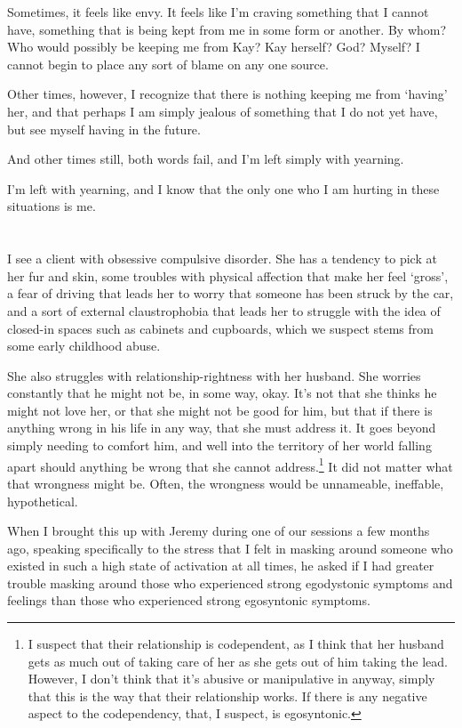 Sometimes, it feels like envy. It feels like I'm craving something that I cannot have, something that is being kept from me in some form or another. By whom? Who would possibly be keeping me from Kay? Kay herself? God? Myself? I cannot begin to place any sort of blame on any one source.

Other times, however, I recognize that there is nothing keeping me from `having' her, and that perhaps I am simply jealous of something that I do not yet have, but see myself having in the future.

And other times still, both words fail, and I'm left simply with yearning.

I'm left with yearning, and I know that the only one who I am hurting in these situations is me.

\section{}

I see a client with obsessive compulsive disorder. She has a tendency to pick at her fur and skin, some troubles with physical affection that make her feel `gross', a fear of driving that leads her to worry that someone has been struck by the car, and a sort of external claustrophobia that leads her to struggle with the idea of closed-in spaces such as cabinets and cupboards, which we suspect stems from some early childhood abuse.

She also struggles with relationship-rightness with her husband. She worries constantly that he might not be, in some way, okay. It's not that she thinks he might not love her, or that she might not be good for him, but that if there is anything wrong in his life in any way, that she must address it. It goes beyond simply needing to comfort him, and well into the territory of her world falling apart should anything be wrong that she cannot address.\footnote{I suspect that their relationship is codependent, as I think that her husband gets as much out of taking care of her as she gets out of him taking the lead. However, I don't think that it's abusive or manipulative in anyway, simply that this is the way that their relationship works. If there is any negative aspect to the codependency, that, I suspect, is egosyntonic.} It did not matter what that wrongness might be. Often, the wrongness would be unnameable, ineffable, hypothetical.

When I brought this up with Jeremy during one of our sessions a few months ago, speaking specifically to the stress that I felt in masking around someone who existed in such a high state of activation at all times, he asked if I had greater trouble masking around those who experienced strong egodystonic symptoms and feelings than those who experienced strong egosyntonic symptoms.

